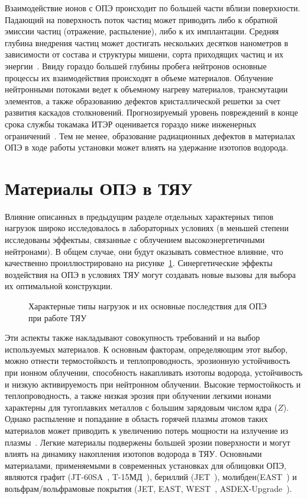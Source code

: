 Взаимодействие ионов с ОПЭ происходит по большей части вблизи поверхности. Падающий на поверхность поток частиц может приводить либо к обратной эмиссии частиц (отражение, распыление), либо к их имплантации. Средняя глубина внедрения частиц может достигать нескольких десятков нанометров в зависимости от состава и структуры мишени, сорта приходящих частиц и их энергии~\cite{eckstein2010penetration}. Ввиду гораздо большей глубины пробега нейтронов основные процессы их взаимодействия происходят в объеме материалов. Облучение нейтронными потоками ведет к объемному нагреву материалов, трансмутации элементов, а также образованию дефектов кристаллической решетки за счет развития каскадов столкновений. Прогнозируемый уровень повреждений в конце срока службы токамака ИТЭР оценивается гораздо ниже инженерных ограничений~\cite{Villari2013}. Тем не менее, образование радиационных дефектов в материалах ОПЭ в ходе работы установки может влиять на удержание изотопов водорода.

\section{Материалы ОПЭ в ТЯУ}\label{sec:ch1/sec2}

Влияние описанных в предыдущим разделе отдельных характерных типов нагрузок широко исследовалось в лабораторных условиях (в меньшей степени исследованы эффектыы, связанные с облучением высокоэнергетичными нейтронами). В общем случае, они будут оказывать совместное влияние, что качественно проиллюстрировано на рисунке~\cref{fig:ch1/synergetic_diagram}. Синергетические эффекты воздействия на ОПЭ в условиях ТЯУ могут создавать новые вызовы для выбора их оптимальной конструкции.
\begin{figure}[ht]
    \caption{Характерные типы нагрузок и их основные последствия для ОПЭ при работе ТЯУ~\cite{Linke2019}}\label{fig:ch1/synergetic_diagram}
\end{figure}
Эти аспекты также накладывают совокупность требований и на выбор используемых материалов. К основным факторам, определяющим этот выбор, можно отнести термостойкость и теплопроводность, эрозионную устойчивость при ионном облучении, способность накапливать изотопы водорода, устойчивость и низкую активируемость при нейтронном облучении. Высокие термостойкость и теплопроводность, а также низкая эрозия при облучении легкими ионами характерны для тугоплавких металлов с большим зарядовым числом ядра ($Z$). Однако распыление и попадание в область горячей плазмы атомов таких материалов может приводить к увеличению потерь мощности на излучение из плазмы~\cite{Ptterich2019}. Легкие материалы подвержены большей эрозии поверхности и могут влиять на динамику накопления изотопов водорода в ТЯУ. Основными материалами, применяемыми в современных установках для облицовки ОПЭ, являются графит (JT-60SA~\cite{Shirai2024}, T-15МД~\cite{Velikhov2024}), бериллий (JET~\cite{Maggi2024,Kappatou2025}), молибден(EAST~\cite{Gong2024}) и вольфрам/вольфрамовые покрытия (JET, EAST, WEST~\cite{Shi2025}, ASDEX-Upgrade~\cite{Rohde2009}). 

